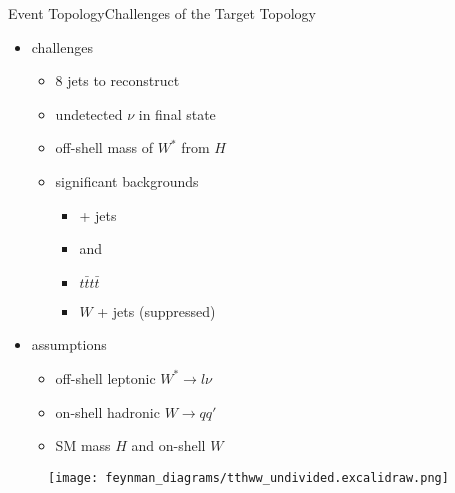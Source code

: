 \documentclass[9pt, aspectratio=169]{beamer}
\begin{document}
\begin{frame}{Event Topology}{Challenges of the Target Topology}
	\begin{minipage}{.58\textwidth}
		\begin{itemize}
			\item challenges
			\begin{itemize}
				\item 8 jets to reconstruct
				\item undetected $\nu$ in final state
				\item off-shell mass of $W^*$ from $H$
				\item significant backgrounds
				\begin{itemize}
					\item \ttbar + jets
					\item \ttbarZ and \ttbarW
					\item $t\bar{t}t\bar{t}$
					\item $W$ + jets (suppressed)
				\end{itemize}
			\end{itemize}
			\item assumptions
			\begin{itemize}
				\item off-shell leptonic $W^*\rightarrow l\nu$
				\item on-shell hadronic $W\rightarrow qq'$
				\item SM mass $H$ and on-shell $W$
			\end{itemize}
		\end{itemize}
	\end{minipage}
	\begin{minipage}{.4\textwidth}
		\begin{figure}
			\centering
			\texttt{[image: feynman\_diagrams/tthww\_undivided.excalidraw.png]}
		\end{figure}
	\end{minipage}
\end{frame}
\end{document}
